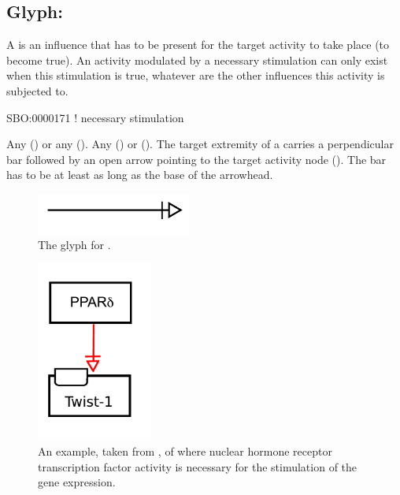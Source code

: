 \subsection{Glyph: }
\label{sec:af:trigger}
A  is an influence that has to be present for the target activity to take place (to become true).  An activity modulated by a necessary stimulation can only exist when this stimulation is true, whatever are the other influences this activity is subjected to.

\begin{glyphDescription}

\glyphSboTerm SBO:0000171 ! necessary stimulation

  \glyphOrigin Any  () or any  ().
 \glyphTarget Any  () or  ().
 \glyphEndPoint The target extremity of a  carries a perpendicular bar followed by an open arrow pointing to the target activity node ().  The bar has to be at least as long as the base of the arrowhead.

\end{glyphDescription}

\begin{figure}[H]
  \centering
  \includegraphics[width = 2in]{images/build/necessaryStimulation.pdf}
  \caption{The \AF glyph for .}
  \label{fig:af:trigger}
\end{figure}

\begin{figure}[H]
  \centering
  \includegraphics[width = 1.5in]{images/build/ex-necessaryStimulation.pdf}
  \caption{An example, taken from , of  where nuclear hormone receptor  transcription factor activity is necessary for the stimulation of the  gene expression. }
  \label{fig:af:ex-NS}
\end{figure}

